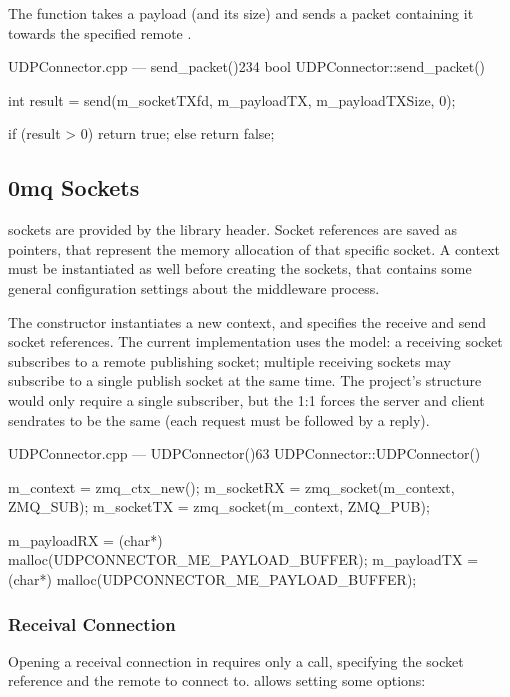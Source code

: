 The  function takes a \gls{payload} (and its size) and sends a \gls{packet} containing it towards the specified remote .

\begin{codelist}{UDPConnector.cpp --- send\_packet()}{234}
bool UDPConnector::send_packet() {
    int result = send(m_socketTXfd, m_payloadTX, m_payloadTXSize, 0);

    if (result > 0)
        return true;
    else
        return false;
}
\end{codelist}

\subsection{0mq Sockets}

 sockets are provided by the  library  header. Socket references are saved as  pointers, that represent the memory allocation of that specific socket. A context must be instantiated as well before creating the sockets, that contains some general configuration settings about the  middleware process.

The  constructor instantiates a new context, and specifies the receive and send socket references. The current implementation uses the  model: a receiving socket subscribes to a remote publishing socket; multiple receiving sockets may subscribe to a single publish socket at the same time. The project's structure would only require a single subscriber, but the 1:1   forces the server and client sendrates to be the same (each request must be followed by a reply).

\begin{codelist}{UDPConnector.cpp --- UDPConnector()}{63}
UDPConnector::UDPConnector() {
    m_context  = zmq_ctx_new();
    m_socketRX = zmq_socket(m_context, ZMQ_SUB);
    m_socketTX = zmq_socket(m_context, ZMQ_PUB);

    m_payloadRX = (char*) malloc(UDPCONNECTOR_ME_PAYLOAD_BUFFER);
    m_payloadTX = (char*) malloc(UDPCONNECTOR_ME_PAYLOAD_BUFFER);
}
\end{codelist}

\subsubsection{Receival Connection}

Opening a receival connection in  requires only a  call, specifying the socket reference and the remote  to connect to.  allows setting some options:

